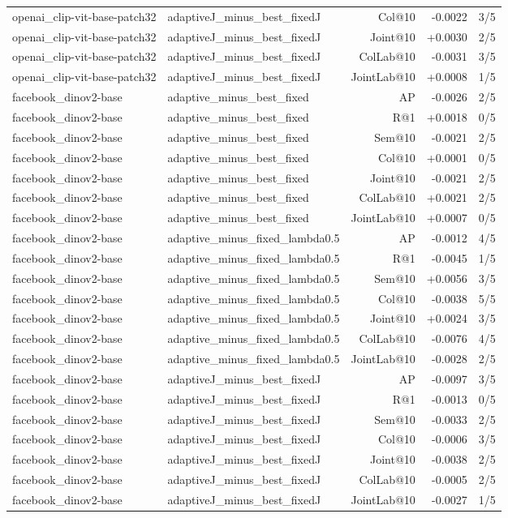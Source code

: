 \begin{table}[t]
{\begin{tabular}{llrrr}
openai\_clip-vit-base-patch32 & adaptiveJ\_minus\_best\_fixedJ & Col@10 & -0.0022 & 3/5 \\
openai\_clip-vit-base-patch32 & adaptiveJ\_minus\_best\_fixedJ & Joint@10 & +0.0030 & 2/5 \\
openai\_clip-vit-base-patch32 & adaptiveJ\_minus\_best\_fixedJ & ColLab@10 & -0.0031 & 3/5 \\
openai\_clip-vit-base-patch32 & adaptiveJ\_minus\_best\_fixedJ & JointLab@10 & +0.0008 & 1/5 \\
facebook\_dinov2-base & adaptive\_minus\_best\_fixed & AP & -0.0026 & 2/5 \\
facebook\_dinov2-base & adaptive\_minus\_best\_fixed & R@1 & +0.0018 & 0/5 \\
facebook\_dinov2-base & adaptive\_minus\_best\_fixed & Sem@10 & -0.0021 & 2/5 \\
facebook\_dinov2-base & adaptive\_minus\_best\_fixed & Col@10 & +0.0001 & 0/5 \\
facebook\_dinov2-base & adaptive\_minus\_best\_fixed & Joint@10 & -0.0021 & 2/5 \\
facebook\_dinov2-base & adaptive\_minus\_best\_fixed & ColLab@10 & +0.0021 & 2/5 \\
facebook\_dinov2-base & adaptive\_minus\_best\_fixed & JointLab@10 & +0.0007 & 0/5 \\
facebook\_dinov2-base & adaptive\_minus\_fixed\_lambda0.5 & AP & -0.0012 & 4/5 \\
facebook\_dinov2-base & adaptive\_minus\_fixed\_lambda0.5 & R@1 & -0.0045 & 1/5 \\
facebook\_dinov2-base & adaptive\_minus\_fixed\_lambda0.5 & Sem@10 & +0.0056 & 3/5 \\
facebook\_dinov2-base & adaptive\_minus\_fixed\_lambda0.5 & Col@10 & -0.0038 & 5/5 \\
facebook\_dinov2-base & adaptive\_minus\_fixed\_lambda0.5 & Joint@10 & +0.0024 & 3/5 \\
facebook\_dinov2-base & adaptive\_minus\_fixed\_lambda0.5 & ColLab@10 & -0.0076 & 4/5 \\
facebook\_dinov2-base & adaptive\_minus\_fixed\_lambda0.5 & JointLab@10 & -0.0028 & 2/5 \\
facebook\_dinov2-base & adaptiveJ\_minus\_best\_fixedJ & AP & -0.0097 & 3/5 \\
facebook\_dinov2-base & adaptiveJ\_minus\_best\_fixedJ & R@1 & -0.0013 & 0/5 \\
facebook\_dinov2-base & adaptiveJ\_minus\_best\_fixedJ & Sem@10 & -0.0033 & 2/5 \\
facebook\_dinov2-base & adaptiveJ\_minus\_best\_fixedJ & Col@10 & -0.0006 & 3/5 \\
facebook\_dinov2-base & adaptiveJ\_minus\_best\_fixedJ & Joint@10 & -0.0038 & 2/5 \\
facebook\_dinov2-base & adaptiveJ\_minus\_best\_fixedJ & ColLab@10 & -0.0005 & 2/5 \\
facebook\_dinov2-base & adaptiveJ\_minus\_best\_fixedJ & JointLab@10 & -0.0027 & 1/5 \\
\bottomrule\end{tabular}}
\end{table}